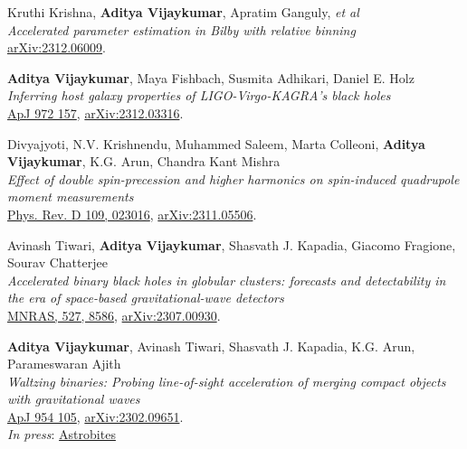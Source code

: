 \begin{etaremune}
	\item
	Kruthi Krishna, \textbf{Aditya Vijaykumar}, Apratim Ganguly, \textit{et al}  \\
	\textit{Accelerated parameter estimation in Bilby with relative binning}\\
	\href{https://arxiv.org/abs/2312.06009}{arXiv:2312.06009}.

    \item
	\textbf{Aditya Vijaykumar}, Maya Fishbach, Susmita Adhikari, Daniel E. Holz  \\
	\textit{Inferring host galaxy properties of LIGO-Virgo-KAGRA's black holes
}\\
	\href{https://iopscience.iop.org/article/10.3847/1538-4357/ad6140}{ApJ 972 157}, \href{https://arxiv.org/abs/2312.03316}{arXiv:2312.03316}.

	\item
	Divyajyoti, N.V. Krishnendu, Muhammed Saleem, Marta Colleoni, \textbf{Aditya Vijaykumar}, K.G. Arun, Chandra Kant Mishra  \\
	\textit{Effect of double spin-precession and higher harmonics on spin-induced quadrupole moment measurements}\\
	\href{https://journals.aps.org/prd/abstract/10.1103/PhysRevD.109.023016}{Phys. Rev. D 109, 023016}, \href{https://arxiv.org/abs/2311.05506}{arXiv:2311.05506}.

	\item
	Avinash Tiwari, \textbf{Aditya Vijaykumar}, Shasvath J. Kapadia, Giacomo Fragione, Sourav Chatterjee  \\
	\textit{Accelerated binary black holes in globular clusters: forecasts and detectability in the era of space-based gravitational-wave detectors}\\
	\href{https://academic.oup.com/mnras/article/527/3/8586/7459933}{MNRAS, 527, 8586}, \href{https://arxiv.org/abs/2307.00930}{arXiv:2307.00930}.

	\item
	\textbf{Aditya Vijaykumar}, Avinash Tiwari, Shasvath J. Kapadia, K.G. Arun, Parameswaran Ajith  \\
	\textit{Waltzing binaries: Probing line-of-sight acceleration of merging compact objects with gravitational waves}\\
	\href{https://iopscience.iop.org/article/10.3847/1538-4357/acd77d}{ApJ 954 105}, \href{https://arxiv.org/abs/2302.09651}{arXiv:2302.09651}.\\
    \textit{In press}: \href{https://astrobites.org/2023/03/17/grab-doppler-dance-partner/}{Astrobites}
	

\end{etaremune}
